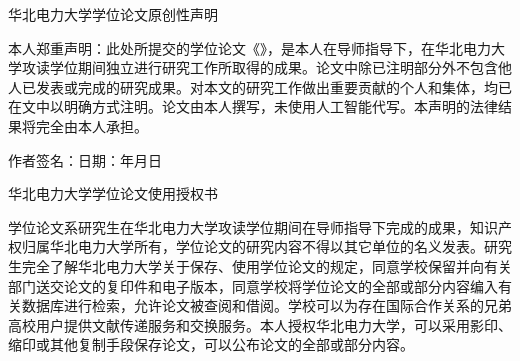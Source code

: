 
\clearpage
\thispagestyle{empty}

{
\centering
\heiti{}
\linespread{1.25}\selectfont  %
\setlength{\parskip}{0pt}
\setlength{\parindent}{0pt}
\vspace{1em}  %
华北电力大学学位论文原创性声明
\vspace{0.5em}  %
\par
}

{\songti{}
\linespread{1.25}\selectfont  %
\setlength{\parskip}{0pt}
本人郑重声明：此处所提交的学位论文《\hspace{8em}》，是本人在导师指导下，在华北电力大学攻读学位期间独立进行研究工作所取得的成果。论文中除已注明部分外不包含他人已发表或完成的研究成果。对本文的研究工作做出重要贡献的个人和集体，均已在文中以明确方式注明。论文由本人撰写，未使用人工智能代写。本声明的法律结果将完全由本人承担。}

\vspace{2em}

\noindent
\hspace{1.32cm}作者签名：\hspace{6em}\hspace{4.6em}日期：\hspace{2em}年\hspace{2em}月\hspace{2em}日

\vspace{2cm}

{
\centering
\heiti{}
\linespread{1.25}\selectfont  %
\setlength{\parskip}{0pt}
\setlength{\parindent}{0pt}
\vspace{1em}  %
华北电力大学学位论文使用授权书
\vspace{0.5em}  %
\par
}

\vspace{1em}

{\songti{}
\linespread{1.25}\selectfont  %
\setlength{\parskip}{0pt}
学位论文系研究生在华北电力大学攻读学位期间在导师指导下完成的成果，知识产权归属华北电力大学所有，学位论文的研究内容不得以其它单位的名义发表。研究生完全了解华北电力大学关于保存、使用学位论文的规定，同意学校保留并向有关部门送交论文的复印件和电子版本，同意学校将学位论文的全部或部分内容编入有关数据库进行检索，允许论文被查阅和借阅。学校可以为存在国际合作关系的兄弟高校用户提供文献传递服务和交换服务。本人授权华北电力大学，可以采用影印、缩印或其他复制手段保存论文，可以公布论文的全部或部分内容。}

